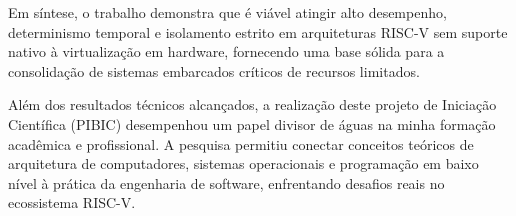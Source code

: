 Em síntese, o trabalho demonstra que é viável atingir alto desempenho, determinismo temporal e isolamento estrito em arquiteturas RISC-V sem suporte nativo à virtualização em hardware,
fornecendo uma base sólida para a consolidação de sistemas embarcados críticos de recursos limitados.

Além dos resultados técnicos alcançados, a realização deste projeto de Iniciação Científica (PIBIC) desempenhou um papel divisor de águas na minha formação acadêmica e profissional.
A pesquisa permitiu conectar conceitos teóricos de arquitetura de computadores, sistemas operacionais e programação em baixo nível à prática da engenharia de software, enfrentando desafios reais no
ecossistema RISC-V.
